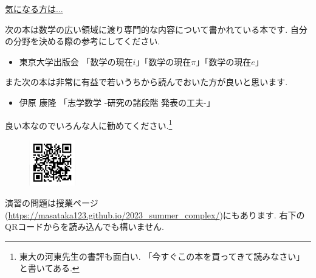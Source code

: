 \documentclass[dvipdfmx,a4paper,11pt]{article}
\theoremstyle{definition}
\begin{document}
   \vspace{12pt}
\hspace{-24pt}\underline{気になる方は...}

次の本は数学の広い領域に渡り専門的な内容について書かれている本です. 自分の分野を決める際の参考にしてください. 

\begin{itemize}
\setlength{\parskip}{0cm} 
  \setlength{\itemsep}{0cm} 
\item 東京大学出版会  「数学の現在$i$」「数学の現在$\pi$」「数学の現在$e$」
   \end{itemize}
また次の本は非常に有益で若いうちから読んでおいた方が良いと思います. 
\begin{itemize}
\setlength{\parskip}{0cm} 
  \setlength{\itemsep}{0cm} 
  \item 伊原 康隆 「志学数学 -研究の諸段階 発表の工夫-」
   \end{itemize}
良い本なのでいろんな人に勧めてください.\footnote{東大の河東先生の書評も面白い. 「今すぐこの本を買ってきて読みなさい」と書いてある.}


 \vspace{11pt}\begin{figure}  \centering\includegraphics[height=20mm, width=20mm]{complex.png}\end{figure}

演習の問題は授業ページ(\url{https://masataka123.github.io/2023_summer_complex/})にもあります. 右下のQRコードからを読み込んでも構いません.


  
  
 
\end{document}
